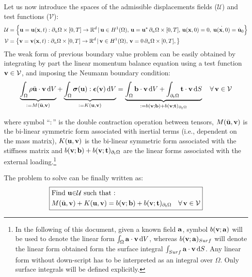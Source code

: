 \documentclass{report}
\newcommand{\bx}{\textbf{x}}
\newcommand{\bb}{\textbf{b}}
\newcommand{\bu}{\textbf{u}}
\newcommand{\bv}{\textbf{v}}
\newcommand{\bt}{\boldsymbol t}
\def\bepsilon{\mbox{\boldmath${\epsilon}$}}
\def\bsigma{\mbox{\boldmath${\sigma}$}}
\def\ba{{\bf{a}}}
\def\bb{{\bf{b}}}
\def\bx{{\bf{x}}}
\def\bt{{\bf t}}
\def\bu{{\bf{u}}}
\def\bv{{\bf{v}}}
\begin{document}
Let us now introduce the spaces of the admissible displacements fields ($\mathcal{U}$) and test functions ($\mathcal{V}$):
%
\begin{equation}
\begin{aligned}\mathcal{U} & =\left\{ \bu=\bu(\bx,t):\partial_{u}\Omega\times[0,T]\to\mathbb{R}^{d}\,|\,\bu\in H^{1}(\Omega),\,\bu=\bu^{*}\,\partial_{u}\Omega\times[0,T],\,\bu(\bx,0)=0,\:\dot{\bu(\bx,0)}=\dot{\bu}_{0}\right\} \\
\mathcal{V} & =\left\{ \bv=\bv(\bx,t):\partial_{u}\Omega\times[0,T]\to\mathbb{R}^{d}\,|\,\bv\in H^{1}(\Omega),\,\bv=0\,\partial_{u}\Omega\times[0,T],\right\} 
\end{aligned}
\end{equation}
%
The weak form of previous boundary value problem can be easily obtained
by integrating by part the linear momentum balance equation using
a test function $\bv\in\mathcal{V}$, and imposing the Neumann boundary
condition:
%
\begin{equation}
%
\underbrace{\int_{\Omega}\rho\ddot{\bu}\cdot\bv\,{\rm d}V}_{:=M(\ddot{\bu},\bv)}+\underbrace{\int_{\Omega}\bsigma(\bu):\bepsilon(\bv)\,{\rm d}V}_{:=K(\bu,\bv)}=\underbrace{\int_{\Omega}\bb\cdot\bv\,{\rm d}V+\int_{\partial_{t}\Omega}\bt\cdot\bv\,{\rm d}S}_{:=b(\bv;\bb)+b(\bv;\bt)_{\partial_{t}\Omega}}\quad\forall\,\bv\in\mathcal{V}
%
\end{equation}

where symbol ``$:$'' is the double contraction operation between
tensors, $M(\ddot{\bu},\bv)$ is the bi-linear symmetric form associated
with inertial terms (i.e., dependent on the mass matrix), $K(\bu,\bv)$
is the bi-linear symmetric form associated with the stiffness matrix
and $b(\bv;\bb)+b(\bv;\bt)_{\partial_{t}\Omega}$ are the linear forms
associated with the external loading.\footnote{In the following of this document, given a known field $\ba$, symbol
$b(\bv;\ba)$ will be used to denote the linear form $\int_{\Omega}\ba\cdot\bv\,{\rm d}V$,
whereas $b(\bv;\ba)_{Surf}$ will denote the linear form obtained
form the surface integral $\int_{Surf}\ba\cdot\bv\,{\rm d}S$. Any
linear form without down-script has to be interpreted as an integral
over $\Omega$. Only surface integrals will be defined
explicitly.}

The problem to solve can be finally written as:
\begin{equation}
\boxed{\begin{aligned} & \text{Find \ensuremath{\bu}\ensuremath{\in}\ensuremath{\mathcal{U}} such that : }\\
 & M(\ddot{\bu},\bv)+K(\bu,\bv)=b(\bv;\bb)+b(\bv;\bt)_{\partial_{t}\Omega}\quad\forall\,\bv\in\mathcal{V}
\end{aligned}
}
\end{equation}
\end{document}
